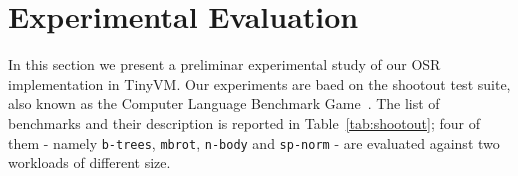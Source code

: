
\section{Experimental Evaluation}
\label{se:experiments}

In this section we present a preliminar experimental study of our OSR implementation in TinyVM. Our experiments are baed on the shootout test suite, also known as the Computer Language Benchmark Game~\cite{shootout}. %
The list of benchmarks and their description is reported in Table~\ref{tab:shootout}; four of them - namely {\tt b-trees}, {\tt mbrot}, {\tt n-body} and {\tt sp-norm} - are evaluated against two workloads of different size.

